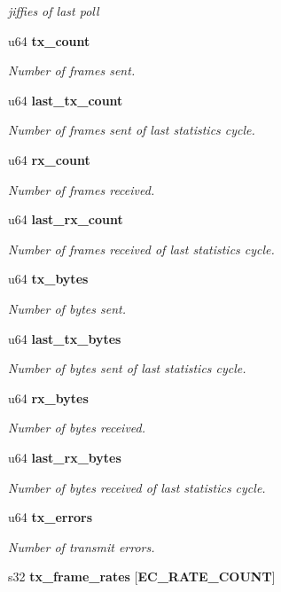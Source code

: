 \begin{DoxyCompactItemize}
\begin{DoxyCompactList}\small\item\em jiffies of last poll \end{DoxyCompactList}\item 
u64 {\bf tx\-\_\-count}
\begin{DoxyCompactList}\small\item\em \-Number of frames sent. \end{DoxyCompactList}\item 
u64 {\bf last\-\_\-tx\-\_\-count}
\begin{DoxyCompactList}\small\item\em \-Number of frames sent of last statistics cycle. \end{DoxyCompactList}\item 
u64 {\bf rx\-\_\-count}
\begin{DoxyCompactList}\small\item\em \-Number of frames received. \end{DoxyCompactList}\item 
u64 {\bf last\-\_\-rx\-\_\-count}
\begin{DoxyCompactList}\small\item\em \-Number of frames received of last statistics cycle. \end{DoxyCompactList}\item 
u64 {\bf tx\-\_\-bytes}
\begin{DoxyCompactList}\small\item\em \-Number of bytes sent. \end{DoxyCompactList}\item 
u64 {\bf last\-\_\-tx\-\_\-bytes}
\begin{DoxyCompactList}\small\item\em \-Number of bytes sent of last statistics cycle. \end{DoxyCompactList}\item 
u64 {\bf rx\-\_\-bytes}
\begin{DoxyCompactList}\small\item\em \-Number of bytes received. \end{DoxyCompactList}\item 
u64 {\bf last\-\_\-rx\-\_\-bytes}\label{structec__device_a53f0337afe2d2bdb4b24e2ee4ccb8180}

\begin{DoxyCompactList}\small\item\em \-Number of bytes received of last statistics cycle. \end{DoxyCompactList}\item 
u64 {\bf tx\-\_\-errors}
\begin{DoxyCompactList}\small\item\em \-Number of transmit errors. \end{DoxyCompactList}\item 
s32 {\bf tx\-\_\-frame\-\_\-rates} [{\bf \-E\-C\-\_\-\-R\-A\-T\-E\-\_\-\-C\-O\-U\-N\-T}]\label{structec__device_a0de91079b171a6b07cb724a6362f340b}


\end{DoxyCompactItemize}
